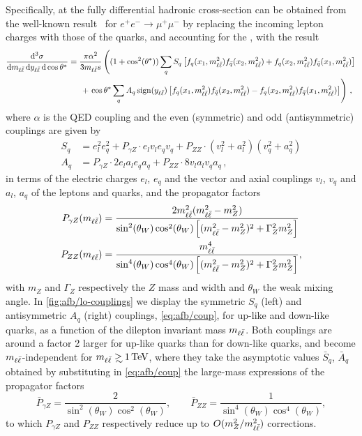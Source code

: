 Specifically, at \lo the fully differential hadronic cross-section can
be obtained from the well-known result~\cite{Peskin:1995ev} for
$e^+e^-\to\mu^+\mu^-$ by replacing the incoming lepton charges  with
those of the quarks, and accounting for the \pdfs, with
the result
\begin{align}
    \frac{\dd^3 \sigma}{\dd m_{\ell\bar{\ell}} \, \dd y_{\ell\bar{\ell}} \, \dd\cos\theta^*} &= \frac{\pi \alpha^2}{3 m_{\ell\bar{\ell}} s} \left((1+\cos^2({\theta^*})) \sum_q S_q \left[f_q(x_1,m_{\ell\bar{\ell}}^2) f_{\bar{q}}(x_2,m_{\ell\bar{\ell}}^2) + f_q(x_2,m_{\ell\bar{\ell}}^2) f_{\bar{q}}(x_1,m_{\ell\bar{\ell}}^2) \right] \right. \nonumber\\
    &\hspace*{15pt} + \left. \cos\theta^* \sum_q A_q \operatorname{sign} (y_{\ell\bar{\ell}}) \left[ f_q(x_1,m_{\ell\bar{\ell}}^2) f_{\bar{q}}(x_2,m_{\ell\bar{\ell}}^2) - f_q(x_2,m_{\ell\bar{\ell}}^2) f_{\bar{q}}(x_1,m_{\ell\bar{\ell}}^2)\right] \right) \, ,
    \label{eq:afb/lo-triple-diff}
\end{align}
where  $\alpha$ is the QED coupling and the even (symmetric) and
odd  (antisymmetric) couplings are given by
\begin{align}
  \label{eq:afb/coup}
    S_q &= e_l^2 e_q^2 + P_{\gamma Z} \cdot  e_l v_l e_q v_q + P_{ZZ} \cdot  (v_l^2+a_l^2)(v_q^2+a_q^2) \nonumber \\
    A_q &= P_{\gamma Z} \cdot 2 e_l a_l e_q a_q  + P_{ZZ} \cdot 8 v_l a_l  v_q a_q \, ,
\end{align}
in terms of the electric charges  $e_l$, $e_q$ and the vector and
axial couplings $v_l$, $v_q$ and $a_l$, $a_q$  of the leptons and
quarks, and the propagator factors
\begin{align}\label{eq:afb/propgz}
    P_{\gamma Z}(m_{\ell\bar{\ell}}) &= \frac{2m_{\ell\bar{\ell}}^2 (m_{\ell\bar{\ell}}^2  - m_Z^2)}{\sin^2(\theta_W) \cos^2(\theta_W)\left[(m_{\ell\bar{\ell}}^2 - m_Z^2)^2 + \Gamma_Z^2 m_Z^2\right]}\\
\label{eq:afb/propzz}
    P_{ZZ}(m_{\ell\bar{\ell}}) &= \frac{m_{\ell\bar{\ell}}^4}{\sin^4(\theta_W) \cos^4(\theta_W)\left[(m_{\ell\bar{\ell}}^2 - m_Z^2)^2 + \Gamma_Z^2 m_Z^2\right]},
\end{align}
with $m_Z$  and $\Gamma_Z$ respectively the $Z$ mass and width and $\theta_W$ the weak mixing angle.
%
In \cref{fig:afb/lo-couplings} we display the
symmetric $S_q$ (left) and antisymmetric $A_q$ (right)
couplings, \cref{eq:afb/coup}, for up-like and
down-like quarks, as a function of 
the dilepton invariant mass $m_{\ell\bar{\ell}}$.
%
Both couplings are around a factor 2 larger for
up-like quarks than for down-like quarks, and
become $m_{\ell\bar{\ell}}$-independent for $\mll \gsim \SI{1}{\tera\electronvolt}$, where they take
the asymptotic values $\bar S_q$, $\bar A_q$ obtained by
substituting in \cref{eq:afb/coup} the large-mass expressions of
the propagator factors
\begin{equation}\label{eq:afb/propasympt}
    \bar P_{\gamma Z} = \frac{2}{\sin^2(\theta_W)\cos^2(\theta_W)},
    \qquad 
    \bar P_{ZZ} = \frac{1}{\sin^4(\theta_W) \cos^4(\theta_W)},
\end{equation}
to which $P_{\gamma Z}$ and $P_{ZZ}$ respectively reduce up to $O(m^2_Z/m_{\ell\bar{\ell}}^2)$ corrections.

